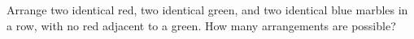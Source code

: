 Arrange two identical red, two identical green, and two identical blue marbles in a row, with no red adjacent to a green. How many arrangements are possible?

